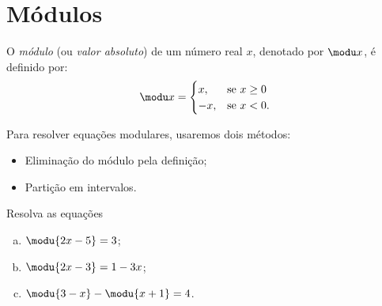 \section{Módulos}

\begin{definition}
O \emph{módulo} (ou \emph{valor absoluto}) de um número real $x$,
denotado por $\modu x$, é definido por:
%
$$
\modu x =
\begin{cases}
x , & \text{se $x \ge 0$} \\
-x, & \text{se $x<0$}.
\end{cases}
$$
\end{definition}

\noindent Para resolver equações modulares, usaremos dois métodos:
%
\begin{itemize}
  \item Eliminação do módulo pela definição;
  \item Partição em intervalos.
\end{itemize}

\begin{example}
Resolva as equações
\begin{enumerate}[(a)]
  \item $\modu {2x-5} = 3$;
  \item $\modu{2x-3} = 1-3x$;
  \item $\modu{3-x} - \modu{x+1} = 4$.
\end{enumerate}
\end{example}

